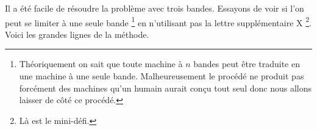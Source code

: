 Il a été facile de résoudre la problème avec trois bandes. Essayons de voir si l'on peut se limiter à une seule bande
\footnote{
	Théoriquement on sait que toute machine à $n$ bandes peut être traduite en une machine à une seule bande.
	Malheureusement le procédé ne produit pas forcément des machines qu'un humain aurait conçu tout seul donc nous allons laisser de côté ce procédé.
}
en n'utilisant pas la lettre supplémentaire X
\footnote{
	Là est le mini-défi.
}.
Voici les grandes lignes de la méthode.

\begin{multicols}{2}
%
\emptybox\emptybox%
\emptybox\emptybox

\phantom{\emptybox\emptybox}%
	\head


\medskip %


\emptybox\emptybox%
\emptybox\emptybox

\phantom{\emptybox\emptybox\emptybox\emptybox\emptybox\emptybox\emptybox\emptybox\emptybox\emptybox\emptybox}%
	\head


\medskip %


\emptybox\emptybox%
	\emptybox\emptybox%
\emptybox\emptybox

\phantom{\emptybox}%
	\head


\medskip %


\emptybox\emptybox%
	\emptybox{}\emptybox\emptybox%
\emptybox\emptybox

\phantom{\emptybox\emptybox\emptybox\emptybox\emptybox\emptybox\emptybox\emptybox\emptybox}%
	\head


\medskip %


\emptybox\emptybox%
	\emptybox{}\emptybox\emptybox\emptybox\emptybox%
\emptybox\emptybox

\phantom{\emptybox\emptybox}%
	\head


\medskip %


\emptybox\emptybox%
	\emptybox\emptybox{}\emptybox\emptybox\emptybox\emptybox%
\emptybox\emptybox


\end{multicols}
